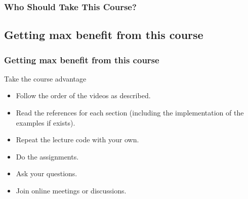 
\begin{frame}
\frametitle{Who Should Take This Course?}

	\scalebox{0.9}
	{
		\begin{adjustbox}{max totalsize={.9\textheight},center}		
		\end{adjustbox}
	}
\end{frame}
\subsection{Getting max benefit from this course}

\begin{frame}
\frametitle{Getting max benefit from this course}
\begin{block}{Take the course advantage}
	\begin{itemize}[<+->]
		\item Follow the order of the videos as described.
		\item Read the references for each section (including the implementation of the examples if exists). 
		\item Repeat the lecture code with your own.  
		\item Do the assignments.
		\item Ask your questions. 
		\item Join online meetings or discussions. 
	\end{itemize}
\end{block}

\end{frame}

